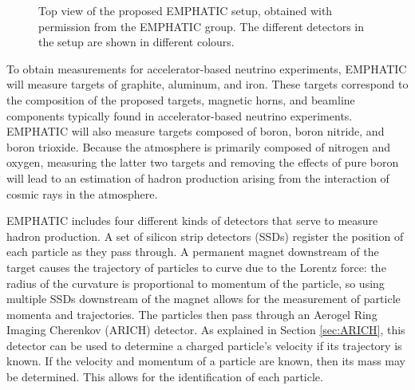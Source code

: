 \begin{figure}[] 
\centering
{}
\caption[Top view of the proposed EMPHATIC setup]{Top view of the proposed EMPHATIC setup, obtained with permission from the EMPHATIC group. The different detectors in the setup are shown in different colours.}
\label{fig:EMPHATIC} 
\end{figure}

To obtain measurements for accelerator-based neutrino experiments, \ac{EMPHATIC} will measure targets of graphite, aluminum, and iron.
These targets correspond to the composition of the proposed targets, magnetic horns, and beamline components typically found in accelerator-based neutrino experiments.
\ac{EMPHATIC} will also measure targets composed of boron, boron nitride, and boron trioxide.
Because the atmosphere is primarily composed of nitrogen and oxygen, measuring the latter two targets and removing the effects of pure boron will lead to an estimation of hadron production arising from the interaction of cosmic rays in the atmosphere. 

\ac{EMPHATIC} includes four different kinds of detectors that serve to measure hadron production.
A set of silicon strip detectors (SSDs) register the position of each particle as they pass through.
A permanent magnet downstream of the target causes the trajectory of particles to curve due to the Lorentz force: the radius of the curvature is proportional to momentum of the particle, so using multiple SSDs downstream of the magnet allows for the measurement of particle momenta and trajectories.
The particles then pass through an Aerogel Ring Imaging Cherenkov (ARICH) detector.
As explained in Section \ref{sec:ARICH}, this detector can be used to determine a charged particle's velocity if its trajectory is known. 
If the velocity and momentum of a particle are known, then its mass may be determined.
This allows for the identification of each particle. 

